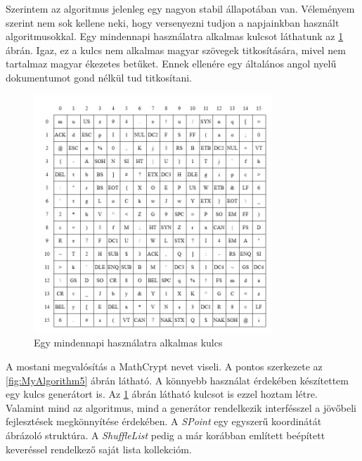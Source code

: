 \documentclass[12pt]{report} %
\begin{document}
Szerintem az algoritmus jelenleg egy nagyon stabil állapotában van. Véleményem szerint nem sok kellene neki, hogy versenyezni tudjon a napjainkban használt algoritmusokkal. Egy mindennapi használatra alkalmas kulcsot láthatunk az \ref{fig:MyAlgorithm4} ábrán. Igaz, ez a kulcs nem alkalmas magyar szövegek titkosítására, mivel nem tartalmaz magyar ékezetes betűket. Ennek ellenére egy általános angol nyelű dokumentumot gond nélkül tud titkosítani.

\begin{figure}[H]
    \centering %
    \includegraphics[width=0.8\textwidth]{Figures/MyAlgorithm4.png} %
    \caption{Egy mindennapi használatra alkalmas kulcs} %
    \label{fig:MyAlgorithm4} %
\end{figure}

A mostani megvalósítás a MathCrypt nevet viseli. A pontos szerkezete az \ref{fig:MyAlgorithm5} ábrán látható. A könnyebb használat érdekében készítettem egy kulcs generátort is. Az \ref{fig:MyAlgorithm4} ábrán látható kulcsot is ezzel hoztam létre. Valamint mind az algoritmus, mind a generátor rendelkezik interfésszel a jövőbeli fejlesztések megkönnyítése érdekében. A \textit{SPoint} egy egyszerű koordinátát ábrázoló struktúra. A \textit{ShuffleList} pedig a már korábban említett beépített keveréssel rendelkező saját lista kollekcióm.
\end{document}
